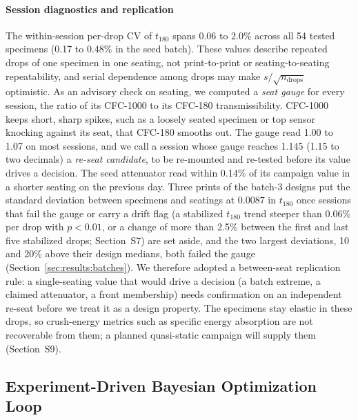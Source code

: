 \documentclass[11pt]{article}
\begin{document}
\paragraph{Session diagnostics and replication} The within-session
per-drop CV of $t_{180}$ spans 0.06 to 2.0\% across all 54 tested
specimens (0.17 to 0.48\% in the seed batch). These values describe
repeated drops of one specimen in one seating, not print-to-print or
seating-to-seating repeatability, and serial dependence among drops may
make $s/\sqrt{n_{\mathrm{drops}}}$ optimistic. As an advisory check on
seating, we computed a \emph{seat gauge} for every session, the ratio of
its CFC-1000 to its CFC-180 transmissibility. CFC-1000 keeps short,
sharp spikes, such as a loosely seated specimen or top sensor knocking
against its seat, that CFC-180 smooths out. The gauge read 1.00 to 1.07
on most sessions, and we call a session whose gauge reaches 1.145 (1.15
to two decimals) a \emph{re-seat candidate}, to be re-mounted and
re-tested before its value drives a decision. The seed attenuator read
within 0.14\% of its campaign value in a shorter seating on the
previous day. Three prints of the
batch-3 designs put the standard deviation between specimens and
seatings at 0.0087 in $t_{180}$ once sessions that fail the gauge or
carry a drift flag (a stabilized $t_{180}$ trend steeper than 0.06\% per
drop with $p < 0.01$, or a change of more than 2.5\% between the first
and last five stabilized drops; Section~S7) are set aside,
and the two largest deviations, 10
and 20\% above their design medians, both failed the gauge
(Section~\ref{sec:results:batches}). We therefore adopted a
between-seat replication rule: a single-seating value that would drive a
decision (a batch extreme, a claimed attenuator, a front membership)
needs confirmation on an independent re-seat before we treat it as a
design property. The specimens stay elastic in these drops, so
crush-energy metrics such as specific energy absorption are not
recoverable from them; a planned quasi-static campaign will supply them
(Section~S9).

\subsection{Experiment-Driven Bayesian Optimization Loop}
\label{sec:methods:bo}
\end{document}
